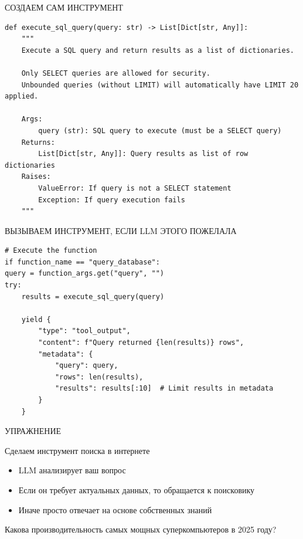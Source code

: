 \documentclass[aspectratio=169]{beamer}
\begin{document}
{\begin{frame}[fragile]{СОЗДАЕМ САМ ИНСТРУМЕНТ }
    
\begin{verbatim}
def execute_sql_query(query: str) -> List[Dict[str, Any]]:
    """
    Execute a SQL query and return results as a list of dictionaries.
    
    Only SELECT queries are allowed for security.
    Unbounded queries (without LIMIT) will automatically have LIMIT 20 applied.
    
    Args:
        query (str): SQL query to execute (must be a SELECT query)    
    Returns:
        List[Dict[str, Any]]: Query results as list of row dictionaries    
    Raises:
        ValueError: If query is not a SELECT statement
        Exception: If query execution fails
    """
\end{verbatim}    
\end{frame}


\begin{frame}[fragile]{ВЫЗЫВАЕМ ИНСТРУМЕНТ, ЕСЛИ LLM ЭТОГО ПОЖЕЛАЛА}
    
\begin{verbatim}
# Execute the function
if function_name == "query_database":
query = function_args.get("query", "")
try:
    results = execute_sql_query(query)
    
    yield {
        "type": "tool_output",
        "content": f"Query returned {len(results)} rows",
        "metadata": {
            "query": query,
            "rows": len(results),
            "results": results[:10]  # Limit results in metadata
        }
    }
\end{verbatim}    
\end{frame}

\begin{frame}{УПРАЖНЕНИЕ}
    
    Сделаем инструмент поиска в интернете
    
    \begin{itemize}
        \item [-] LLM анализирует ваш вопрос
        \item [-] Если он требует актуальных данных, то обращается к поисковику
        \item [-] Иначе просто отвечает на основе собственных знаний
    \end{itemize}
    
    Какова производительность самых мощных суперкомпьютеров в 2025 году?
    

\end{frame}}
\end{document}
